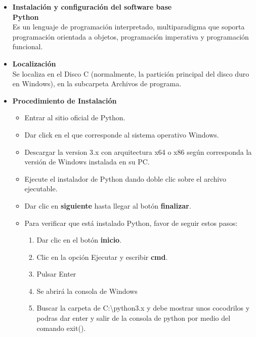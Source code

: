 \begin{itemize}
    \item \textbf{Instalación y configuración del software base}
    \\
    \textbf{Python}
    \\
    Es un lenguaje de programación interpretado, multiparadigma que
    soporta programación orientada a objetos, programación imperativa
    y programación funcional.
    \\
    \item \textbf{Localización}
    \\
    Se localiza en el Disco C (normalmente, la partición principal 
    del disco duro en Windows), en la subcarpeta Archivos de programa.
    \\
    \item \textbf{Procedimiento de Instalación}
    \\
    \begin{itemize}
        \item Entrar al sitio oficial de Python.
        \item Dar click en el que corresponde al sistema operativo Windows.
        \item Descargar la version 3.x con arquitectura x64 o x86 según 
        corresponda la versión de Windows instalada en su PC.
        \item Ejecute el instalador de Python dando doble clic sobre el
        archivo ejecutable.
        \item Dar clic en \textbf{siguiente} hasta llegar al botón \textbf{finalizar}.
        \item Para verificar que está instalado Python, favor de seguir estos pasos:
        \begin{enumerate}
            \item Dar clic en el botón \textbf{inicio}.
            \item Clic en la opción Ejecutar y escribir \textbf{cmd}.
            \item Pulsar Enter
            \item Se abrirá la consola de Windows
            \item Buscar la carpeta de C:\textbackslash{python3.x} y debe mostrar unos 
            cocodrilos y podras dar enter y salir de la consola de python por medio 
            del comando exit().
        \end{enumerate}
    \end{itemize}


\end{itemize}
